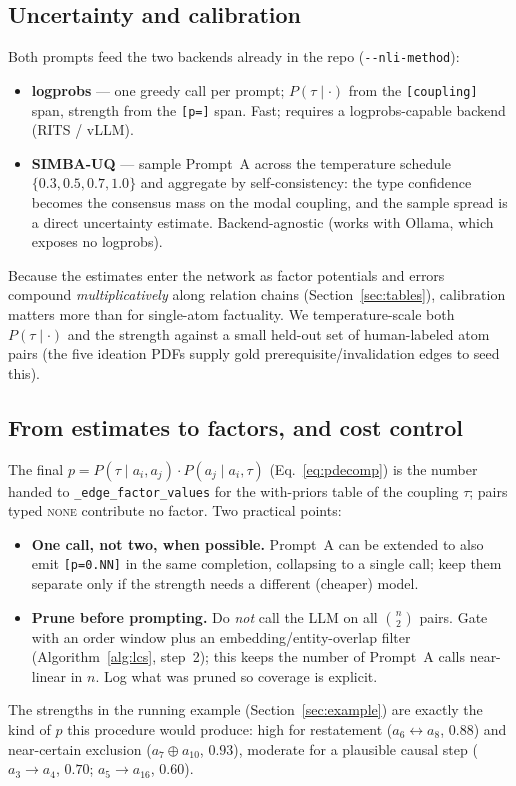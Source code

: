 \documentclass[11pt]{article}
\begin{document}
\subsection{Uncertainty and calibration}
Both prompts feed the two backends already in the repo (\texttt{-{}-nli-method}):
\begin{itemize}[leftmargin=*,nosep]
  \item \textbf{logprobs} --- one greedy call per prompt; $P(\tau\mid\cdot)$ from the
        \texttt{[coupling]} span, strength from the \texttt{[p=]} span. Fast; requires a
        logprobs-capable backend (RITS / vLLM).
  \item \textbf{SIMBA-UQ} \citep{simbauq} --- sample Prompt~A across the temperature schedule
        $\{0.3,0.5,0.7,1.0\}$ and aggregate by self-consistency: the type confidence becomes
        the consensus mass on the modal coupling, and the sample spread is a direct
        uncertainty estimate. Backend-agnostic (works with Ollama, which exposes no
        logprobs).
\end{itemize}
Because the estimates enter the network as factor potentials and errors compound
\emph{multiplicatively} along relation chains (Section~\ref{sec:tables}), calibration
matters more than for single-atom factuality. We temperature-scale both $P(\tau\mid\cdot)$
and the strength against a small held-out set of human-labeled atom pairs (the five ideation
PDFs supply gold prerequisite/invalidation edges to seed this).

\subsection{From estimates to factors, and cost control}
The final $p=P(\tau\mid a_i,a_j)\cdot P(a_j\mid a_i,\tau)$ (Eq.~\ref{eq:pdecomp}) is the
number handed to \texttt{\_edge\_factor\_values} for the with-priors table of the coupling
$\tau$; pairs typed \textsc{none} contribute no factor. Two practical points:
\begin{itemize}[leftmargin=*,nosep]
  \item \textbf{One call, not two, when possible.} Prompt~A can be extended to also emit
        \texttt{[p=0.NN]} in the same completion, collapsing to a single call; keep them
        separate only if the strength needs a different (cheaper) model.
  \item \textbf{Prune before prompting.} Do \emph{not} call the LLM on all
        $\binom n2$ pairs. Gate with an order window plus an embedding/entity-overlap
        filter (Algorithm~\ref{alg:lcs}, step~2); this keeps the number of Prompt~A calls
        near-linear in $n$. Log what was pruned so coverage is explicit.
\end{itemize}
The strengths in the running example (Section~\ref{sec:example}) are exactly the kind of
$p$ this procedure would produce: high for restatement ($a_6\!\leftrightarrow\!a_8$, $0.88$)
and near-certain exclusion ($a_7\!\oplus\!a_{10}$, $0.93$), moderate for a plausible causal
step ($a_3\!\to\!a_4$, $0.70$; $a_5\!\to\!a_{16}$, $0.60$).
\end{document}
